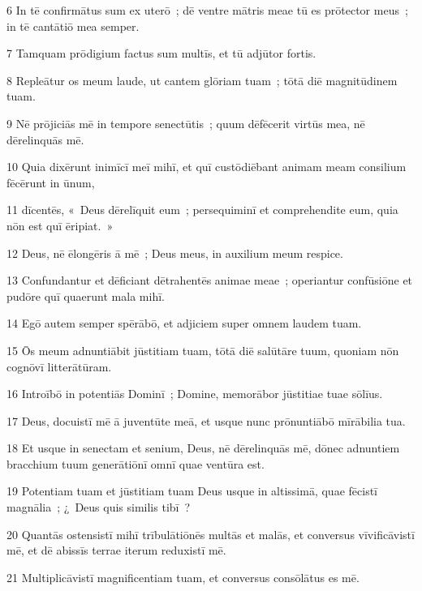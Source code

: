 \psalmVerse
  {\phantom{00}6}
  {In tē confirmātus sum ex uterō~; dē ventre mātris meae tū es prōtector meus~; in tē cantātiō mea semper.}


\psalmVerse
  {\phantom{00}7}
  {Tamquam prōdigium factus sum multīs, et tū adjūtor fortis.}


\psalmVerse
  {\phantom{00}8}
  {Repleātur os meum laude, ut cantem glōriam tuam~; tōtā diē magnitūdinem tuam.}


\psalmVerse
  {\phantom{00}9}
  {Nē prōjiciās mē in tempore senectūtis~; quum dēfēcerit virtūs mea, nē dērelinquās mē.}


\psalmVerse
  {\phantom{0}10}
  {Quia dixērunt inimīcī meī mihī, et quī custōdiēbant animam meam consilium fēcērunt in ūnum,}


\psalmVerse
  {\phantom{0}11}
  {dīcentēs, «~Deus dērelīquit eum~; persequiminī et comprehendite eum, quia nōn est quī ēripiat.~»}


\psalmVerse
  {\phantom{0}12}
  {Deus, nē ēlongēris ā mē~; Deus meus, in auxilium meum respice.}


\psalmVerse
  {\phantom{0}13}
  {Confundantur et dēficiant dētrahentēs animae meae~; operiantur confūsiōne et pudōre quī quaerunt mala mihī.}


\psalmVerse
  {\phantom{0}14}
  {Egō autem semper spērābō, et adjiciem super omnem laudem tuam.}


\psalmVerse
  {\phantom{0}15}
  {Ōs meum adnuntiābit jūstitiam tuam, tōtā diē salūtāre tuum, quoniam nōn cognōvī litterātūram.}


\psalmVerse
  {\phantom{0}16}
  {Introībō in potentiās Dominī~; Domine, memorābor jūstitiae tuae sōlīus.}


\psalmVerse
  {\phantom{0}17}
  {Deus, docuistī mē ā juventūte meā, et usque nunc prōnuntiābō mīrābilia tua.}


\psalmVerse
  {\phantom{0}18}
  {Et usque in senectam et senium, Deus, nē dērelinquās mē, dōnec adnuntiem bracchium tuum generātiōnī omnī quae ventūra est.}


\psalmVerse
  {\phantom{0}19}
  {Potentiam tuam et jūstitiam tuam Deus usque in altissimā, quae fēcistī magnālia~; ¿~Deus quis similis tibī~?}


\psalmVerse
  {\phantom{0}20}
  {Quantās ostensistī mihī trībulātiōnēs multās et malās, et conversus vīvificāvistī mē, et dē abissīs terrae iterum reduxistī mē.}


\psalmVerse
  {\phantom{0}21}
  {Multiplicāvistī magnificentiam tuam, et conversus consōlātus es mē.}


